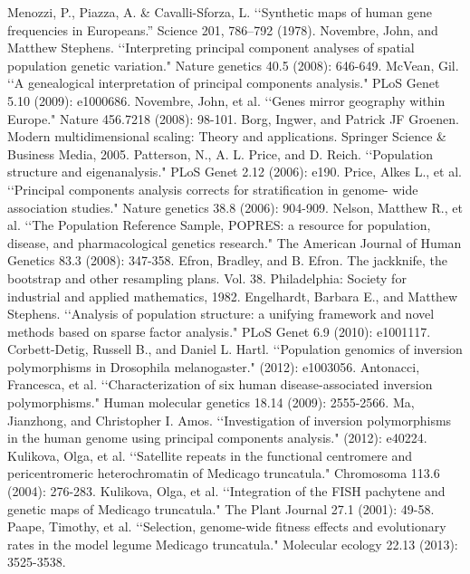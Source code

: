 \documentclass[11pt, oneside]{article}   	%
\begin{document}
\begin{thebibliography}{99}
 Menozzi, P., Piazza, A. \& Cavalli-Sforza, L. \lq\lq Synthetic maps of human gene frequencies in Europeans.'' Science 201, 786--792 (1978).
 Novembre, John, and Matthew Stephens. \lq\lq Interpreting principal component analyses of spatial population genetic variation." Nature genetics 40.5 (2008): 646-649.
 McVean, Gil. \lq\lq A genealogical interpretation of principal components analysis." PLoS Genet 5.10 (2009): e1000686.
 Novembre, John, et al. \lq\lq Genes mirror geography within Europe." Nature 456.7218 (2008): 98-101.
 Borg, Ingwer, and Patrick JF Groenen. Modern multidimensional scaling: Theory and applications. Springer Science \& Business Media, 2005.
 Patterson, N., A. L. Price, and D. Reich. \lq\lq Population structure and eigenanalysis." PLoS Genet 2.12 (2006): e190.
 Price, Alkes L., et al. \lq\lq Principal components analysis corrects for stratification in genome- wide association studies." Nature genetics 38.8 (2006): 904-909.
 Nelson, Matthew R., et al. \lq\lq The Population Reference Sample, POPRES: a resource for population, disease, and pharmacological genetics research." The American Journal of Human Genetics 83.3 (2008): 347-358.
 Efron, Bradley, and B. Efron. The jackknife, the bootstrap and other resampling plans. Vol. 38. Philadelphia: Society for industrial and applied mathematics, 1982.
 Engelhardt, Barbara E., and Matthew Stephens. \lq\lq Analysis of population structure: a unifying framework and novel methods based on sparse factor analysis." PLoS Genet 6.9 (2010): e1001117.
 Corbett-Detig, Russell B., and Daniel L. Hartl. \lq\lq Population genomics of inversion polymorphisms in Drosophila melanogaster." (2012): e1003056.
 Antonacci, Francesca, et al. \lq\lq Characterization of six human disease-associated inversion polymorphisms." Human molecular genetics 18.14 (2009): 2555-2566.
 Ma, Jianzhong, and Christopher I. Amos. \lq\lq Investigation of inversion polymorphisms in the human genome using principal components analysis." (2012): e40224.
 Kulikova, Olga, et al. \lq\lq Satellite repeats in the functional centromere and pericentromeric heterochromatin of Medicago truncatula." Chromosoma 113.6 (2004): 276-283.
 Kulikova, Olga, et al. \lq\lq Integration of the FISH pachytene and genetic maps of Medicago truncatula." The Plant Journal 27.1 (2001): 49-58.
 Paape, Timothy, et al. \lq\lq Selection, genome-wide fitness effects and evolutionary rates in the model legume Medicago truncatula." Molecular ecology 22.13 (2013): 3525-3538.







\end{thebibliography}
\end{document}
